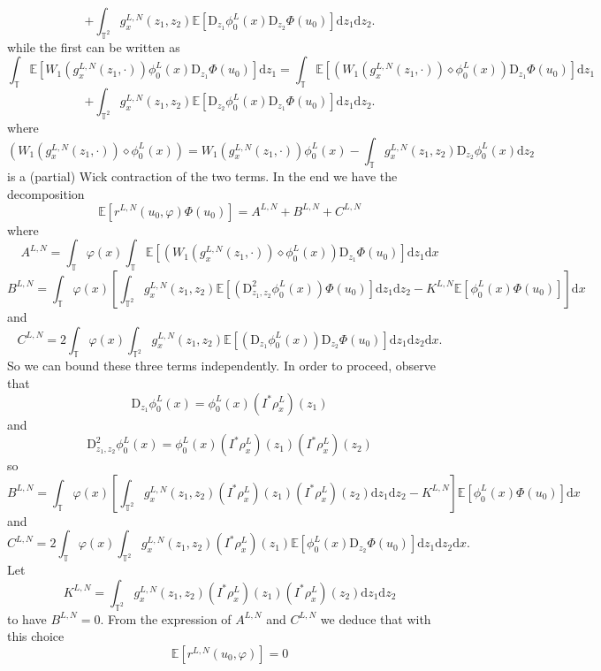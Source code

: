 \documentclass[a4paper,11pt]{article}
\newcommand{\mathD}{\mathrm{D}}
\newcommand{\mathd}{\mathrm{d}}
\begin{document}
\[ + \int_{\mathbb{T}^2} g_x^{L, N} (z_1, z_2) \mathbb{E} [\mathD_{z_1}
   \phi_0^L (x) \mathD_{z_2} \Phi (u_0)] \mathd z_1 \mathd z_2 . \]
while the first can be written as
\[ \int_{\mathbb{T}} \mathbb{E} [W_1 (g_x^{L, N} (z_1, \cdot)) \phi_0^L (x)
   \mathD_{z_1} \Phi (u_0)] \mathd z_1 = \int_{\mathbb{T}} \mathbb{E} [(W_1
   (g_x^{L, N} (z_1, \cdot)) \diamond \phi_0^L (x)) \mathD_{z_1} \Phi (u_0)]
   \mathd z_1 \]
\[ + \int_{\mathbb{T}^2} g_x^{L, N} (z_1, z_2) \mathbb{E} [\mathD_{z_2}
   \phi_0^L (x) \mathD_{z_1} \Phi (u_0)] \mathd z_1 \mathd z_2 . \]
where
\[ (W_1 (g_x^{L, N} (z_1, \cdot)) \diamond \phi_0^L (x)) = W_1 (g_x^{L, N}
   (z_1, \cdot)) \phi_0^L (x) - \int_{\mathbb{T}} g_x^{L, N} (z_1, z_2)
   \mathD_{z_2} \phi_0^L (x) \mathd z_2 \]
is a (partial) Wick contraction of the two terms. In the end we have the
decomposition
\[ \mathbb{E} [r^{L, N} (u_0, \varphi) \Phi (u_0)] = A^{L, N} + B^{L, N} +
   C^{L, N} \]
where
\[ A^{L, N} = \int_{\mathbb{T}} \varphi (x) \int_{\mathbb{T}} \mathbb{E}
   [(W_1 (g_x^{L, N} (z_1, \cdot)) \diamond \phi_0^L (x)) \mathD_{z_1} \Phi
   (u_0)] \mathd z_1 \mathd x \]
\[ B^{L, N} = \int_{\mathbb{T}} \varphi (x) \left[ \int_{\mathbb{T}^2}
   g_x^{L, N} (z_1, z_2) \mathbb{E} \left[ (\mathD_{z_1, z_2}^2 \phi_0^L (x))
   \Phi \left( u_0 \right) \right] \mathd z_1 \mathd z_2 - K^{L, N}
   \mathbb{E} [^{} \phi_0^L (x) \Phi (u_0)] \right] \mathd x \]
and
\[ C^{L, N} = 2 \int_{\mathbb{T}} \varphi (x) \int_{\mathbb{T}^2} g_x^{L, N}
   (z_1, z_2) \mathbb{E} [(\mathD_{z_1} \phi_0^L (x)) \mathD_{z_2} \Phi
   (u_0)] \mathd z_1 \mathd z_2 \mathd x. \]
\[ \  \]
So we can bound these three terms independently. In order to proceed, observe
that
\[ \mathD_{z_1} \phi_0^L (x) = \phi_0^L (x) (I^{\ast} \rho_x^L) (z_1) \]
and
\[ \mathD_{z_1, z_2}^2 \phi_0^L (x) = \phi_0^L (x) (I^{\ast} \rho_x^L) (z_1)
   (I^{\ast} \rho_x^L) (z_2) \]
so
\[ B^{L, N} = \int_{\mathbb{T}} \varphi (x) \left[ \int_{\mathbb{T}^2}
   g_x^{L, N} (z_1, z_2) (I^{\ast} \rho_x^L) (z_1) (I^{\ast} \rho_x^L) (z_2)
   \mathd z_1 \mathd z_2 - K^{L, N} \right] \mathbb{E} [\phi_0^L (x) \Phi
   (u_0)] \mathd x \]
and
\[ C^{L, N} = 2 \int_{\mathbb{T}} \varphi (x) \int_{\mathbb{T}^2} g_x^{L, N}
   (z_1, z_2) (I^{\ast} \rho_x^L) (z_1) \mathbb{E} [\phi_0^L (x) \mathD_{z_2}
   \Phi (u_0)] \mathd z_1 \mathd z_2 \mathd x . \]
Let
\[ K^{L, N} = \int_{\mathbb{T}^2} g_x^{L, N} (z_1, z_2) (I^{\ast} \rho_x^L)
   (z_1) (I^{\ast} \rho_x^L) (z_2) \mathd z_1 \mathd z_2 \]
to have $B^{L, N} = 0$. From the expression of $A^{L, N}$ and $C^{L, N}$ we
deduce that with this choice
\[ \mathbb{E} [r^{L, N} (u_0, \varphi)] = 0 \]
\end{document}

